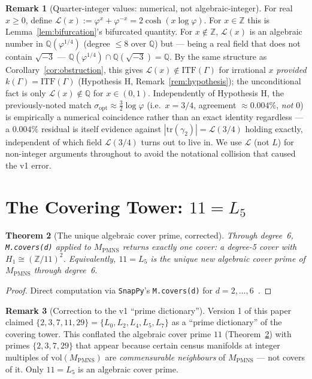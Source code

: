 \documentclass[12pt]{article}
\newtheorem{theorem}{Theorem}
\theoremstyle{definition}
\newtheorem{remark}[theorem]{Remark}
\newcommand{\Z}{\mathbb{Z}}
\newcommand{\Q}{\mathbb{Q}}
\newcommand{\ph}{\varphi}
\newcommand{\Lcal}{\mathcal{L}}
\newcommand{\logph}{\log\ph}
\newcommand{\tr}{\mathrm{tr}}
\newcommand{\ITF}{\mathrm{ITF}}
\begin{document}
\begin{remark}[Quarter-integer values: numerical, not algebraic-integer]
\label{rem:quarter}
For real $x\geq0$, define $\Lcal(x):=\ph^x+\ph^{-x}=2\cosh(x\logph)$.
For $x\in\Z$ this is Lemma~\ref{lem:bifurcation}'s bifurcated
quantity. For $x\notin\Z$, $\Lcal(x)$ is an algebraic number in
$\Q(\ph^{1/4})$ (degree $\leq8$ over $\Q$) but --- being a real field
that does not contain $\sqrt{-3}$ --- $\Q(\ph^{1/4})\cap\Q(\sqrt{-3})
=\Q$. By the same structure as Corollary~\ref{cor:obstruction}, this
gives $\Lcal(x)\notin\ITF(\Gamma)$ for irrational $x$ \emph{provided}
$k(\Gamma)=\ITF(\Gamma)$ (Hypothesis H, Remark~\ref{rem:hypothesis});
the unconditional fact is only $\Lcal(x)\notin\Q$ for $x\in(0,1)$.
Independently of Hypothesis H, the previously-noted match
$\sigma_{\mathrm{opt}}\approx\tfrac32\logph$ (i.e.\ $x=3/4$, agreement
$\approx0.004\%$, \emph{not} $0$) is empirically a numerical
coincidence rather than an exact identity regardless --- a $0.004\%$
residual is itself evidence against
$|\tr(\gamma_2)|=\Lcal(3/4)$ holding exactly, independent of which
field $\Lcal(3/4)$ turns out to live in. We use $\Lcal$ (not $L$) for
non-integer arguments throughout to avoid the notational collision
that caused the v1 error.
\end{remark}

\section{The Covering Tower: $11=L_5$}
\label{sec:cover}

\begin{theorem}[The unique algebraic cover prime, corrected]
\label{thm:cover}
Through degree~6, \texttt{M.covers(d)} applied to $M_{\mathrm{PMNS}}$
returns exactly one cover: a degree-5 cover with
$H_1\cong(\Z/11)^2$. Equivalently, $11=L_5$ is the unique new
algebraic cover prime of $M_{\mathrm{PMNS}}$ through degree~6.
\end{theorem}

\begin{proof}
Direct computation via \texttt{SnapPy}'s \texttt{M.covers(d)} for
$d=2,\ldots,6$~\cite{snappy}.
\end{proof}

\begin{remark}[Correction to the v1 ``prime dictionary'']
\label{rem:dict-correction}
Version 1 of this paper claimed
$\{2,3,7,11,29\}=\{L_0,L_2,L_4,L_5,L_7\}$ as a ``prime dictionary'' of
the covering tower. This conflated the algebraic cover prime $11$
(Theorem~\ref{thm:cover}) with primes $\{2,3,7,29\}$ that appear
because certain census manifolds at integer multiples of
$\mathrm{vol}(M_{\mathrm{PMNS}})$ are \emph{commensurable neighbours}
of $M_{\mathrm{PMNS}}$ --- not covers of it. Only $11=L_5$ is an
algebraic cover prime.
\end{remark}
\end{document}
